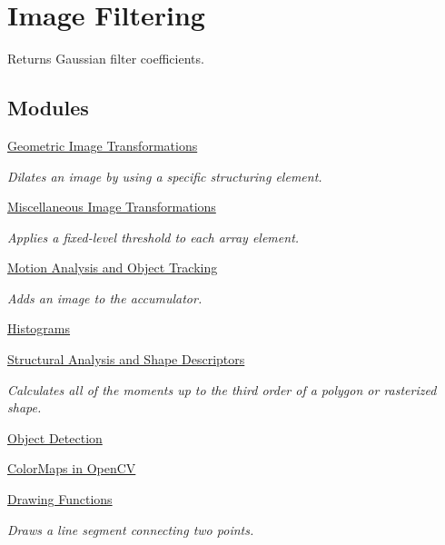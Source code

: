 \hypertarget{group__imgproc__filter}{}\section{Image Filtering}
\label{group__imgproc__filter}


Returns Gaussian filter coefficients.  


\subsection*{Modules}
\begin{DoxyCompactItemize}
\item 
\hyperlink{group__imgproc__transform}{Geometric Image Transformations}
\begin{DoxyCompactList}\small\item\em Dilates an image by using a specific structuring element. \end{DoxyCompactList}\item 
\hyperlink{group__imgproc__misc}{Miscellaneous Image Transformations}
\begin{DoxyCompactList}\small\item\em Applies a fixed-\/level threshold to each array element. \end{DoxyCompactList}\item 
\hyperlink{group__imgproc__motion}{Motion Analysis and Object Tracking}
\begin{DoxyCompactList}\small\item\em Adds an image to the accumulator. \end{DoxyCompactList}\item 
\hyperlink{group__imgproc__hist}{Histograms}
\item 
\hyperlink{group__imgproc__shape}{Structural Analysis and Shape Descriptors}
\begin{DoxyCompactList}\small\item\em Calculates all of the moments up to the third order of a polygon or rasterized shape. \end{DoxyCompactList}\item 
\hyperlink{group__imgproc__object}{Object Detection}
\item 
\hyperlink{group__imgproc__colormap}{Color\+Maps in Open\+CV}
\item 
\hyperlink{group__imgproc__draw}{Drawing Functions}
\begin{DoxyCompactList}\small\item\em Draws a line segment connecting two points. \end{DoxyCompactList}\end{DoxyCompactItemize}
